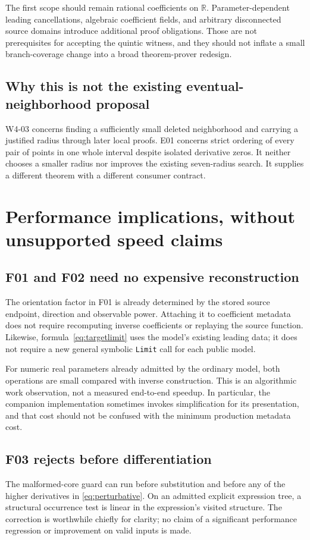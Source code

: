 \documentclass[11pt,letterpaper]{article}
\newcommand{\code}[1]{\nolinkurl{#1}}
\newcommand{\R}{\mathbb R}
\begin{document}
The first scope should remain rational coefficients on \(\R\). Parameter-dependent leading cancellations, algebraic coefficient fields, and arbitrary disconnected source domains introduce additional proof obligations. Those are not prerequisites for accepting the quintic witness, and they should not inflate a small branch-coverage change into a broad theorem-prover redesign.

\subsection{Why this is not the existing eventual-neighborhood proposal}
W4-03 concerns finding a sufficiently small deleted neighborhood and carrying a justified radius through later local proofs. E01 concerns strict ordering of every pair of points in one whole interval despite isolated derivative zeros. It neither chooses a smaller radius nor improves the existing seven-radius search. It supplies a different theorem with a different consumer contract.\cite{wave4}

\section{Performance implications, without unsupported speed claims}
\label{sec:performance}

\subsection{F01 and F02 need no expensive reconstruction}
The orientation factor in F01 is already determined by the stored source endpoint, direction and observable power. Attaching it to coefficient metadata does not require recomputing inverse coefficients or replaying the source function. Likewise, formula~\eqref{eq:targetlimit} uses the model's existing leading data; it does not require a new general symbolic \code{Limit} call for each public model.

For numeric real parameters already admitted by the ordinary model, both operations are small compared with inverse construction. This is an algorithmic work observation, not a measured end-to-end speedup. In particular, the companion implementation sometimes invokes simplification for its presentation, and that cost should not be confused with the minimum production metadata cost.

\subsection{F03 rejects before differentiation}
The malformed-core guard can run before substitution and before any of the higher derivatives in \eqref{eq:perturbative}. On an admitted explicit expression tree, a structural occurrence test is linear in the expression's visited structure. The correction is worthwhile chiefly for clarity; no claim of a significant performance regression or improvement on valid inputs is made.
\end{document}
